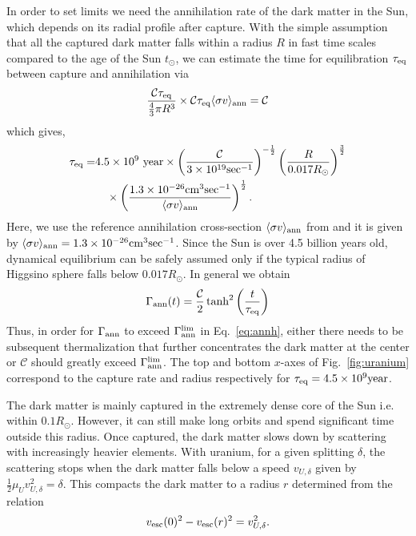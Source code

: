 \documentclass[prl,reprint,superscriptaddress]{revtex4-2}
\begin{document}
In order to set limits we need the annihilation rate of the dark matter in the Sun, which depends on its radial profile after capture. With the simple assumption that all the captured dark matter falls within a radius $R$ in fast time scales compared to the age of the Sun $t_\odot$, we can estimate the time for equilibration $\tau_{\rm eq}$ between capture and annihilation   via
\begin{equation}
\frac{\mathcal{C}\tau_{\rm eq}}{\frac{4}{3}\pi R^3 } \times \mathcal{C}\tau_{\rm eq} \langle \sigma v \rangle _{\rm ann} =\mathcal{C}
\end{equation}
which gives,
\begin{align}
\tau_{\rm eq}=&4.5\times 10^9~\textrm{year} \times \left(\frac{\mathcal{C}}{3\times 10^{19}\text{sec}^{-1}}\right)^{-\frac{1}{2}}\left(\frac{R}{0.017 R_\odot}\right)^\frac{3}{2}\nonumber \\ &\quad \times \left(\frac{1.3 \times 10^{-26} \textrm{cm}^3\textrm{sec}^{-1}}{\langle\sigma v\rangle_{\rm ann}}\right)^{\frac{1}{2}}.
\label{eq:teq}
\end{align}
Here, we use the reference annihilation cross-section ${\langle\sigma v\rangle_{\rm ann}}$ from \cite{Beneke:2014hja}  and it is given by ${\langle\sigma v\rangle_{\rm ann}}=1.3 \times 10^{-26} \textrm{cm}^3\textrm{sec}^{-1}$. 
Since the Sun is over 4.5 billion years old, dynamical equilibrium can be safely assumed only if the typical radius of Higgsino sphere falls below $0.017 R_\odot$. In general we obtain
\begin{equation}
\Gamma_{\rm ann}(t)= \frac{\mathcal{C}}{2} \tanh^2 \left(\frac{t}{\tau_{\rm eq}}\right)
\label{eq:annrate}
\end{equation}
Thus, in order for $\Gamma_{\rm ann}$ to exceed $\Gamma^{\rm lim}_{\rm ann}$ in Eq.~\ref{eq:annh}, either there needs to be subsequent thermalization that further concentrates the dark matter at the center or $\mathcal{C}$ should greatly exceed $\Gamma^{\rm lim}_{\rm ann}$. The top and bottom $x$-axes of Fig.~\ref{fig:uranium} correspond to the capture rate and radius respectively for $\tau_{\rm eq}=4.5 \times 10^9 \textrm{year}$. 

The dark matter is mainly captured in the extremely dense core of the Sun i.e. within $0.1 R_\odot$. However, it can still make long orbits and spend significant time outside this radius. Once captured, the dark matter slows down by scattering with increasingly heavier elements. With uranium, for a given splitting $\delta$, the scattering stops when the dark matter falls below a speed $v_{U,\delta}$ given by $\frac{1}{2} \mu_U v_{U,\delta}^2=\delta$. This compacts the dark matter to a radius $r$ determined from the relation 
\begin{equation}
v_{\rm esc}(0)^2-v_{\rm esc}(r)^2=v^2_{U,\delta}.
\end{equation}
\end{document}
